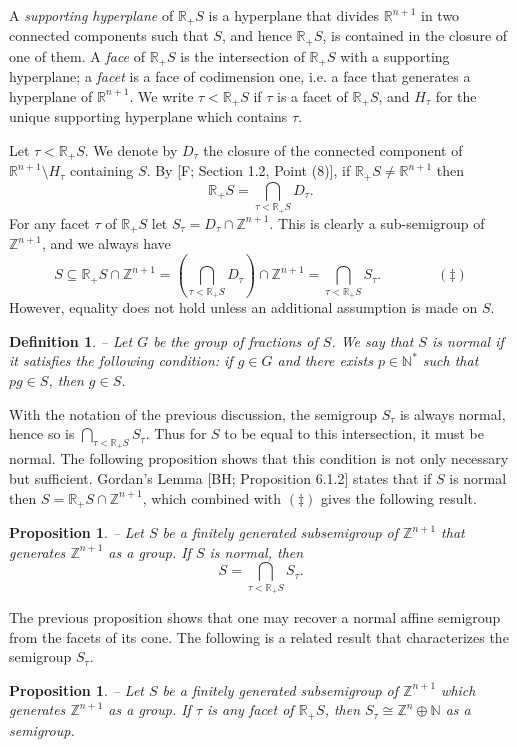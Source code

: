 \documentclass[twoside,11pt]{article}
\newcommand{\N}{{\mathbb N}}
\newcommand{\Z}{{\mathbb Z}}
\newcommand{\RR}{{\mathbb R}}
\newtheorem{subproposition}[subtheorem]{Proposition}
\newtheorem{subdefinition}[subtheorem]{Definition}
\begin{document}
A \emph{supporting hyperplane} of $\RR_+S$ is a hyperplane that divides $\RR^{n+1}$ in two
connected components such that $S$, and hence $\RR_+ S$, is contained in the closure of
one of them. A \emph{face} of $\RR_+ S$ is the intersection of $\RR_+S$ with a supporting
hyperplane; a \emph{facet} is a face of codimension one, i.e. a face that generates a
hyperplane of $\RR^{n+1}$. We write $\tau < \RR_+ S$ if $\tau$ is a facet of $\RR_+S$, and 
$H_\tau$ for the unique supporting hyperplane which contains $\tau$.

Let $\tau < \RR_+ S$. We denote by $D_\tau$ the closure of the connected component of
$\RR^{n+1} \setminus H_\tau$ containing $S$. By [F; Section 1.2, Point (8)], if $\RR_+S
\neq \RR^{n+1}$ then
\[
\displaystyle \RR_+S = \bigcap_{\tau < \RR_+ S} D_\tau.
\]
For any facet $\tau$ of $\RR_+S$ let $S_\tau=D_\tau \cap \Z^{n+1}$. This is clearly a
sub-semigroup of $\Z^{n+1}$, and we always have
\[
S \subseteq \RR_+S \cap \Z^{n+1} = \left(\bigcap_{\tau < \RR_+ S} D_\tau\right) \cap
\Z^{n+1} = \bigcap_{\tau < \RR_+ S} S_\tau. \qquad \qquad (\ddagger)
\]
However, equality does not hold unless an additional assumption is made on $S$.
\begin{subdefinition} -- 
Let $G$ be the group of fractions of $S$. We say that $S$ is
\emph{normal} if it satisfies the following condition: if $g \in G$ and there exists $p
\in \N^*$ such that $p g \in S$, then $g \in S$.
\end{subdefinition}
With the notation of the previous discussion, the semigroup $S_\tau$ is always normal,
hence so is $\bigcap_{\tau < \RR_+ S} S_\tau$. Thus for $S$ to be equal to this
intersection, it must be normal. The following proposition shows that this condition is
not only necessary but sufficient. Gordan's Lemma [BH; Proposition 6.1.2] states that if
$S$ is normal then $S = \RR_+S \cap \Z^{n+1}$, which combined with $(\ddagger)$ gives the
following result.
\begin{subproposition} -- 
\label{intersection-decomposition}
Let $S$ be a finitely generated subsemigroup of $\Z^{n+1}$ that generates $\Z^{n+1}$ as a
group. If $S$ is normal, then
\[
S = \displaystyle \bigcap_{\tau < \RR_+ S} S_\tau.
\]
\end{subproposition}

The previous proposition shows that one may recover a normal affine semigroup from the
facets of its cone. The following is a related result that characterizes the semigroup
$S_\tau$.
\begin{subproposition} -- 
\label{structure-s-tau}
Let $S$ be a finitely generated subsemigroup of $\Z^{n+1}$ which generates $\Z^{n+1}$ as a
group. If $\tau$ is any facet of $\RR_+S$, then $S_\tau \cong \Z^n \oplus \N$ as a
semigroup.
\end{subproposition}
\end{document}
